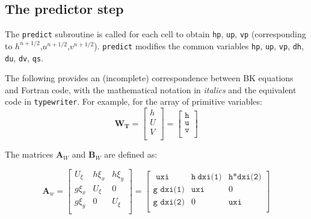 \documentclass{article}
\newcommand{\code}[1]{\texttt{#1}}
\begin{document}
%
%
%
%
%
%
%

\subsection{The predictor step}

The \code{predict} subroutine is called for each cell to obtain \code{hp}, \code{up},  \code{vp} (corresponding to $h^{n+1/2}$,$u^{n+1/2}$,$v^{n+1/2}$).   \code{predict}  modifies the common variables  \code{hp}, \code{up},  \code{vp}, \code{dh}, \code{du}, \code{dv}, \code{qs}.


The following provides an (incomplete) correspondence between BK equations and Fortran code, with the mathematical notation in \textit{italics} and the equivalent code in \code{typewriter}.   For example, for the array of primitive variables:
\[  \mathbf{W_T} = 
\begin{bmatrix}
	h \\
	U \\
	V \\
\end{bmatrix}
 =  {
	 \begin{bmatrix}
	 \code{h} \\
	 \code{u} \\	 
	 \code{v} \\	 	 	 
\end{bmatrix} 
}  \]



The matrices $\mathbf{A}_W$ and $\mathbf{B}_W$ are defined as: 

\[ \mathbf{A}_w = 
\begin{bmatrix}
    U_{\xi} & h \xi_x & h \xi_{y} \\
    g \xi_x &    U_{\xi}  & 0    \\
    g \xi_y &   0   & U_{\xi}    \\    
\end{bmatrix} =
\begin{bmatrix}
    \code{ uxi }& \code{h} \ \code{dxi(1)} &\code{h*dxi(2)}\\
    \code{g dxi(1)}& \code{uxi} & 0  \\    
    \code{g dxi(2)}&     0       & \code{uxi}  \\          
\end{bmatrix} 
\]
\end{document}
